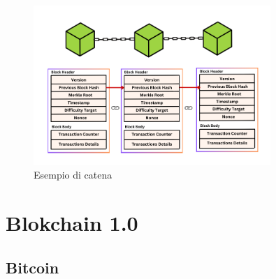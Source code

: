 \begin{figure}[t]
\caption{Esempio di catena}
\centering
\includegraphics[width=0.8\textwidth]{Immagini/structure of block.png}
\end{figure}

\clearpage

\section{Blokchain 1.0}

\subsection{Bitcoin}

